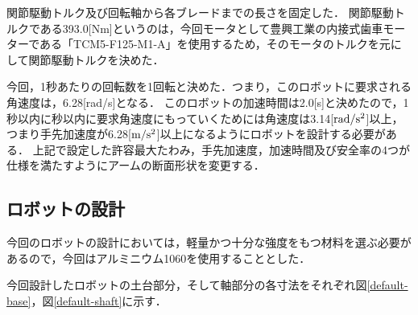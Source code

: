 関節駆動トルク及び回転軸から各ブレードまでの長さを固定した．
関節駆動トルクである393.0{[}Nm{]}というのは，今回モータとして豊興工業の内接式歯車モーターである「TCM5-F125-M1-A」を使用するため，そのモータのトルクを元にして関節駆動トルクを決めた．

今回，1秒あたりの回転数を1回転と決めた．つまり，このロボットに要求される角速度は，6.28{[}rad/s{]}となる．
このロボットの加速時間は2.0{[}s{]}と決めたので，1秒以内に秒以内に要求角速度にもっていくためには角速度は3.14{[}\(\rm rad/s^2\){]}以上，つまり手先加速度が6.28{[}\(\rm m/s^2\){]}以上になるようにロボットを設計する必要がある．
上記で設定した許容最大たわみ，手先加速度，加速時間及び安全率の4つが仕様を満たすようにアームの断面形状を変更する．

\subsection{ロボットの設計}\label{ux30edux30dcux30c3ux30c8ux306eux8a2dux8a08}

今回のロボットの設計においては，軽量かつ十分な強度をもつ材料を選ぶ必要があるので，今回はアルミニウム1060を使用することとした．

今回設計したロボットの土台部分，そして軸部分の各寸法をそれぞれ図\ref{default-base}，図\ref{default-shaft}に示す．

